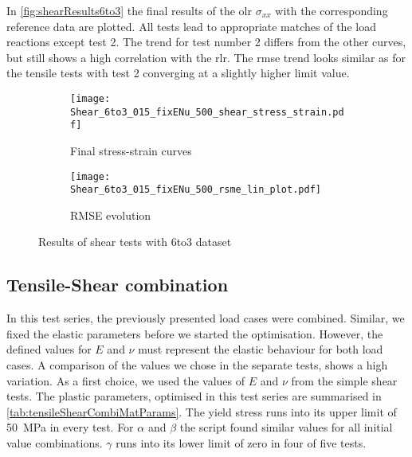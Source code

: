 In \autoref{fig:shearResults6to3} the final results of the \acrlong{olr} $\sigma_{xx}$ with the corresponding reference data are plotted.
All tests lead to appropriate matches of the load reactions except test 2.
The trend for test number 2 differs from the other curves, but still shows a high correlation with the \acrlong{rlr}.
The \acrshort{rmse} trend looks similar as for the tensile tests with test 2 converging at a slightly higher limit value. 


\begin{figure}[H]
\centering
\begin{subfigure}[t]{0.495\textwidth}
    \centering
     \texttt{[image: Shear\_6to3\_015\_fixENu\_500\_shear\_stress\_strain.pdf]}
        \caption{Final stress-strain curves}
        \label{subfig:shearStressStrain6to3}
\end{subfigure}
\hfill
\begin{subfigure}[t]{0.495\textwidth}
    \centering
    \texttt{[image: Shear\_6to3\_015\_fixENu\_500\_rsme\_lin\_plot.pdf]}
        \caption{ RMSE evolution}
        \label{subfig:shearRMSE}
\end{subfigure}
\caption{Results of shear tests with 6to3 dataset}
\label{fig:shearResults6to3}
\end{figure}

\subsection{Tensile-Shear combination}\label{subsec:tensileShearCombi}

In this test series, the previously presented load cases were combined. Similar, we fixed the elastic parameters before we started the optimisation. However, the defined values for $E$ and $\nu$ must represent the elastic behaviour for both load cases. A comparison of the values we chose in the separate tests, shows a high variation. 
As a first choice, we used the values of $E$ and $\nu$ from the simple shear tests. The plastic parameters, optimised in this test series are summarised in \autoref{tab:tensileShearCombiMatParams}. The yield stress runs into its upper limit of 50 MPa in every test. For $\alpha$ and $\beta$ the script found similar values for all initial value combinations. $\gamma$ runs into its lower limit of zero in four of five tests. 

